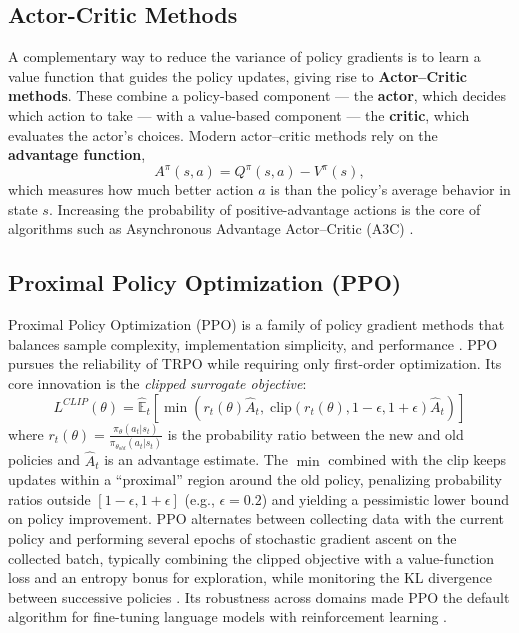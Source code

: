 \subsection{Actor-Critic Methods}

A complementary way to reduce the variance of policy gradients is to learn a value function that guides the policy updates, giving rise to \textbf{Actor--Critic methods}. These combine a policy-based component --- the \textbf{actor}, which decides which action to take --- with a value-based component --- the \textbf{critic}, which evaluates the actor's choices. Modern actor--critic methods rely on the \textbf{advantage function},
\begin{equation}
    A^\pi(s, a) = Q^\pi(s, a) - V^\pi(s),
\end{equation}
which measures how much better action $a$ is than the policy's average behavior in state $s$. Increasing the probability of positive-advantage actions is the core of algorithms such as Asynchronous Advantage Actor--Critic (A3C) \cite{mnih2016asynchronous}.

\subsection{Proximal Policy Optimization (PPO)}

Proximal Policy Optimization (PPO) is a family of policy gradient methods that balances sample complexity, implementation simplicity, and performance \cite{Schulman2017ProximalPO}. PPO pursues the reliability of TRPO while requiring only first-order optimization. Its core innovation is the \textit{clipped surrogate objective}:
\begin{equation}
 L^{CLIP}(\theta) = \hat{\mathbb{E}}_{t}\left[\min\left(r_t(\theta)\hat{A}_t,\; \text{clip}(r_t(\theta), 1-\epsilon, 1+\epsilon)\hat{A}_t\right)\right]
 \label{eq:ppo_clip}
\end{equation}
where $r_t(\theta) = \frac{\pi_{\theta}(a_t|s_t)}{\pi_{\theta_{old}}(a_t|s_t)}$ is the probability ratio between the new and old policies and $\hat{A}_t$ is an advantage estimate. The $\min$ combined with the clip keeps updates within a ``proximal'' region around the old policy, penalizing probability ratios outside $[1-\epsilon, 1+\epsilon]$ (e.g., $\epsilon = 0.2$) and yielding a pessimistic lower bound on policy improvement. PPO alternates between collecting data with the current policy and performing several epochs of stochastic gradient ascent on the collected batch, typically combining the clipped objective with a value-function loss and an entropy bonus for exploration, while monitoring the KL divergence between successive policies \cite{Schulman2017ProximalPO}. Its robustness across domains made PPO the default algorithm for fine-tuning language models with reinforcement learning \cite{ouyang_training_2022}.

